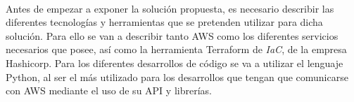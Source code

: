 \documentclass[../../memoria.tex]{subfiles}
\begin{document}
\paragraph{}
Antes de empezar a exponer la solución propuesta, es necesario describir las diferentes tecnologías y herramientas que se pretenden utilizar para dicha solución. Para ello se van a describir tanto AWS como los diferentes servicios necesarios que posee, así como la herramienta Terraform de \textit{IaC}, de la empresa Hashicorp. Para los diferentes desarrollos de código se va a utilizar el lenguaje Python, al ser el más utilizado para los desarrollos que tengan que comunicarse con AWS mediante el uso de su API y librerías.
\end{document}
